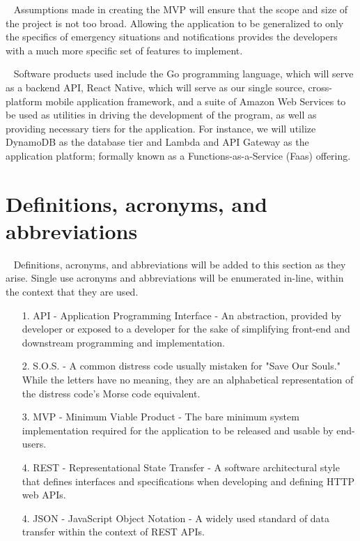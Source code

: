 \documentclass{scrreprt}
\begin{document}
\par ~ Assumptions made in creating the MVP will ensure that the scope and size of the project is not too broad. Allowing the application to be generalized to only the specifics of emergency situations and notifications provides the developers with a much more specific set of features to implement.

\par ~ Software products used include the Go programming language, which will serve as a backend API, React Native, which will serve as our single source, cross-platform mobile application framework, and a suite of Amazon Web Services to be used as utilities in driving the development of the program, as well as providing necessary tiers for the application. For instance, we will utilize DynamoDB as the database tier and Lambda and API Gateway as the application platform; formally known as a Functions-as-a-Service (Faas) offering.


\section{Definitions, acronyms, and abbreviations}
\par ~ Definitions, acronyms, and abbreviations will be added to this section as they arise. Single use acronyms and abbreviations will be enumerated in-line, within the context that they are used.
\begin{enumerate}
	\item[1.] API - Application Programming Interface - An abstraction, provided by developer or exposed to a developer for the sake of simplifying front-end and downstream programming and implementation.
	\item[2.] S.O.S. - A common distress code usually mistaken for "Save Our Souls." While the letters have no meaning, they are an alphabetical representation of the distress code's Morse code equivalent.
	\item[3.] MVP - Minimum Viable Product - The bare minimum system implementation required for the application to be released and usable by end-users.
	\item[4.] REST - Representational State Transfer - A software architectural style that defines interfaces and specifications when developing and defining HTTP web APIs.
	\item[4.] JSON - JavaScript Object Notation - A widely used standard of data transfer within the context of REST APIs.
\end{enumerate}
\end{document}
